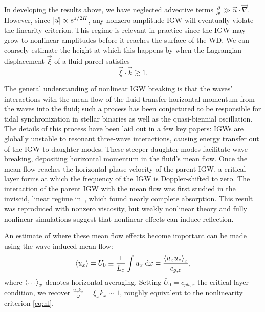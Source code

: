 \documentclass[twocolumn,
        nofootinbib, %
        usenames, %
        aps,
        prd,
        dvipsnames %
    ]{revtex4-1}%
\newcommand*{\pd}[2]{\frac{\partial#1}{\partial#2}}
\DeclarePairedDelimiter\abs{\lvert}{\rvert}
\DeclarePairedDelimiter\ev{\langle}{\rangle}
\begin{document}
In developing the results above, we have neglected advective terms $\pd{}{t} \gg
\vec{u} \cdot \vec{\nabla}$. However, since $\abs*{\vec{u}} \propto e^{z/2H}$,
any nonzero amplitude IGW will eventually violate the linearity criterion. This
regime is relevant in practice since the IGW may grow to nonlinear amplitudes
before it reaches the surface of the WD\cite{fullerI,fullerII}. We can coarsely
estimate the height at which this happens by when the Lagrangian displacement
$\vec{\xi}$ of a fluid parcel satisfies
\begin{equation}
    \vec{\xi} \cdot \vec{k} \gtrsim 1.\label{eq:nl}
\end{equation}

The general understanding of nonlinear IGW breaking is that the waves'
interactions with the mean flow of the fluid transfer horizontal momentum from
the waves into the fluid; such a process has been conjectured to be responsible
for tidal synchronization in stellar binaries\cite{zahn75,gn89} as well as the
quasi-biennial oscillation\cite{lindzen_qbo}. The details of this process have
been laid out in a few key papers: IGWs are globally unstable to resonant
three-wave interactions\cite{drazin}, causing energy transfer out of the IGW to
daughter modes. These steeper daughter modes facilitate wave breaking,
depositing horizontal momentum in the fluid's mean flow\cite{klostermeyer}. Once
the mean flow reaches the horizontal phase velocity of the parent IGW, a
critical layer forms at which the frequency of the IGW is Doppler-shifted to
zero. The interaction of the parent IGW with the mean flow was first studied in
the inviscid, linear regime in~\cite{booker_bretherton}, which found nearly
complete absorption. This result was reproduced with nonzero
viscosity\cite{hazel}, but weakly nonlinear theory\cite{brown_stewartson} and
fully nonlinear simulations\cite{winters1994} suggest that nonlinear effects can
induce reflection.

An estimate of where these mean flow effects become important can be made using
the wave-induced mean flow\cite{eliassen_palm_cite,sutherland0}:
\begin{equation}
     \ev*{u_x} = \bar{U}_0 \equiv \frac{1}{L_x}
        \int\limits u_x\;\mathrm{d}x = \frac{\ev*{u_xu_z}_x}{c_{g,z}},
\end{equation}
where $\ev*{\dots}_x$ denotes horizontal averaging. Setting $\bar{U}_0 = c_{ph,
x}$ the critical layer condition, we recover $\frac{u_xk_x}{\omega} = \xi_x k_x
\sim 1$, roughly equivalent to the nonlinearity criterion \autoref{eq:nl}.
\end{document}
